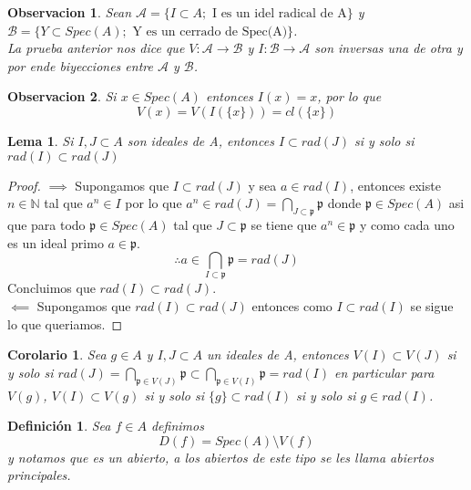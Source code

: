 \documentclass{article}
\newtheorem{definicion}{Definición}
\newtheorem{corolario}{Corolario}
\newtheorem{lema}{Lema}
\newtheorem{observacion}{Observacion}
\begin{document}
\begin{observacion}
    Sean $\mathcal{A} = \{I \subset A; \mbox{ I es un idel radical de A}\}$
    y $\mathcal{B} = \{Y \subset Spec(A); \mbox{ Y es un cerrado de Spec(A)}\}$.\\
    La prueba anterior nos dice que $V:\mathcal{A} \rightarrow \mathcal{B}$ y 
    $I: \mathcal{B} \rightarrow \mathcal{A}$ son inversas una de otra y por ende
    biyecciones entre $\mathcal{A}$ y $\mathcal{B}$.
\end{observacion}

\begin{observacion}
    Si $x\in Spec(A)$ entonces $I({x})=x$, por lo que
    $$V(x)=V(I(\{x\}))=cl(\{x\})$$
\end{observacion}

\begin{lema}
    Si $I, J \subset A$ son ideales de A, entonces 
    $I \subset rad(J)$ si y solo si $rad(I)\subset rad(J)$
\end{lema}
\begin{proof}
    $\implies$ Supongamos que $I \subset rad(J)$ y sea $a \in rad(I)$,
    entonces existe $n \in \mathbb{N}$ tal que $a^n \in I$ por lo que 
    $a^n \in rad(J) = \bigcap_{J\subset \mathfrak{p}}\mathfrak{p}$ donde $\mathfrak{p}\in Spec(A)$
    asi que para todo $\mathfrak{p} \in Spec(A)$ tal que $J\subset \mathfrak{p}$
    se tiene que $a^n \in \mathfrak{p}$ y como cada uno es un ideal primo
    $a\in \mathfrak{p}$.
    $$\therefore a \in \bigcap_{I\subset \mathfrak{p}}\mathfrak{p} = rad(J)$$
    Concluimos que $rad(I) \subset rad(J)$.\\
    $\impliedby$ Supongamos que $rad(I)\subset rad(J)$ entonces como 
    $I\subset rad(I)$ se sigue lo que queriamos.
\end{proof}

\begin{corolario}
    Sea $g \in A$ y $I, J \subset A$ un ideales de A,
    entonces $V(I) \subset V(J)$ si y solo si $rad(J)= \bigcap_{\mathfrak{p} \in V(J)} \mathfrak{p}\subset \bigcap_{\mathfrak{p}\in V(I)}\mathfrak{p} =rad(I)$
    en particular para $V(g)$, $V(I) \subset V(g)$ si y solo si  $\{g\} \subset rad(I)$
    si y solo si $g \in rad(I)$.

\end{corolario}


\begin{definicion}
    Sea $f\in A$ definimos
    $$D(f) = Spec(A) \setminus V(f)$$
    y notamos que es un abierto, a los abiertos de 
    este tipo se les llama abiertos principales.
\end{definicion}
\end{document}
